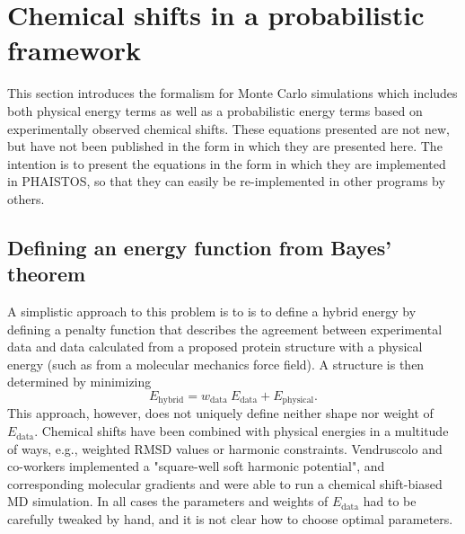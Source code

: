 \chapter{Chemical shifts in a probabilistic framework}

This section introduces the formalism for Monte Carlo simulations which includes both physical energy terms as well as a probabilistic energy terms based on experimentally observed chemical shifts.
These equations presented are not new, but have not been published in the form in which they are presented here.
The intention is to present the equations in the form in which they are implemented in PHAISTOS,  so that they can easily be re-implemented in other programs by others.

\section{Defining an energy function from Bayes' theorem}
A simplistic approach to this problem is to is to define a hybrid energy by defining a penalty function that describes the agreement between experimental data and data calculated from a proposed protein structure with a physical energy (such as from a molecular mechanics force field).
A structure is then determined by minimizing
\begin{equation}
E_{\mathrm{hybrid}}= w_{\mathrm{data}}\ E_{\mathrm{data}}+E_{\mathrm{physical}}.
\end{equation}
This approach, however, does not uniquely define neither shape nor weight of $E_{\mathrm{data}}$.
Chemical shifts have been combined with physical energies in a multitude of ways, e.g., weighted RMSD values or harmonic constraints.
Vendruscolo and co-workers implemented a "square-well soft harmonic potential", and corresponding molecular gradients and were able to run a chemical shift-biased MD simulation.
In all cases the parameters and weights of $E_{\mathrm{data}}$ had to be carefully tweaked by hand, and it is not clear how to choose optimal parameters.

